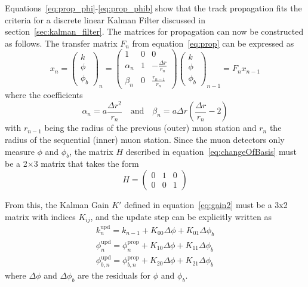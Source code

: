 Equations~\ref{eq:prop_phi}-\ref{eq:prop_phib} show that the track propagation fits the criteria for a discrete linear Kalman Filter discussed in section~\ref{sec:kalman_filter}. The matrices for propagation can now be constructed as follows. The transfer matrix $F_n$ from equation~\ref{eq:prop} can be expressed as
\begin{equation}
	\label{eq:kmtfProp}
	x_{n}=\left(\begin{matrix}
		k\\
		\phi\\
		\phi_b
	\end{matrix}\right)_{n} = 
\left(\begin{matrix}
	1 & 0 & 0\\
	\alpha_n & 1 & -\frac{\Delta r}{r_n}\\
	\beta_n & 0 & \frac{r_{n-1}}{r_n}
\end{matrix}\right)
\left(\begin{matrix}
	k\\
	\phi\\
	\phi_b
\end{matrix}\right)_{n-1}=F_nx_{n-1}
\end{equation}
where the coefficients
\begin{equation}
	\label{eq:kmtf_coeff}
	\alpha_n=a\frac{\Delta r^2}{r_n} \quad \mathrm{and} \quad \beta_n=a\Delta r\left(\frac{\Delta r}{r_n}-2\right)
\end{equation}
with $r_{n-1}$ being the radius of the previous (outer) muon station and $r_n$ the radius of the sequential (inner) muon station. Since the muon detectors only measure $\phi$ and $\phi_b$, the matrix $H$ described in equation~\ref{eq:changeOfBasis} must be a 2$\times$3 matrix that takes the form
\begin{equation}
	H=\left(\begin{matrix}
		0 & 1 & 0\\
		0 & 0 & 1\end{matrix}\right)
\end{equation}

From this, the Kalman Gain $K'$ defined in equation~\ref{eq:gain2} must be a 3x2 matrix with indices $K_{ij}$, and the update step can be explicitly written as
\begin{equation} \label{eq:kmtfUpdate}
	\begin{split}
		k_n^\mathrm{upd}=k_{n-1}+K_{00}\Delta\phi+K_{01}\Delta\phi_b \\
		\phi_n^\mathrm{upd}=\phi_n^\mathrm{prop}+K_{10}\Delta\phi+K_{11}\Delta\phi_b \\
		\phi_{b,n}^\mathrm{upd}=\phi_{b,n}^\mathrm{prop}+K_{20}\Delta\phi+K_{21}\Delta\phi_b
	\end{split}
\end{equation}
where $\Delta\phi$ and $\Delta\phi_b$ are the residuals for $\phi$ and $\phi_b$.

